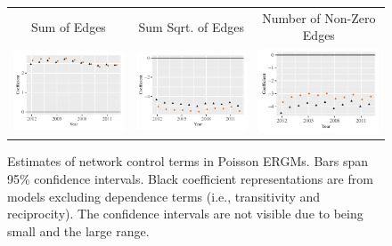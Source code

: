 \documentclass[reqno,onecolumn,letterpaper,12pt]{article}
\begin{document}
\begin{figure}[htp]
\centering
\begin{tabular}{@{\hskip -.05cm}c@{\hskip -.2cm}c@{\hskip -.2cm}c}
Sum of Edges&
Sum Sqrt. of Edges &
Number of Non-Zero Edges\\
\includegraphics[height=.165\textheight, clip=true, trim=.5cm .5cm 0cm .1cm]{figures/main_rl_plots/Sum.pdf}    &
\includegraphics[height=.165\textheight, clip=true, trim=.5cm .5cm 0cm .1cm]{figures/main_rl_plots/Sum_5.pdf}  &
 \includegraphics[height=.165\textheight, clip=true, trim=.5cm .5cm 0cm .1cm]{figures/main_rl_plots/Nonzero.pdf}\\
\end{tabular}
\caption{\label{fig:net_controls} Estimates of network control terms in Poisson ERGMs. Bars span 95\% confidence intervals. Black coefficient representations are from models excluding dependence terms (i.e., transitivity and reciprocity). The confidence intervals are not visible due to being small and the large range.}
\end{figure}
\end{document}

